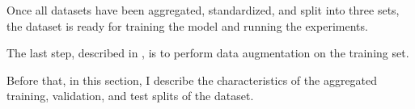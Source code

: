
Once all datasets have been aggregated, standardized, and
split into three sets, the dataset is ready for training the
model and running the experiments.

The last step, described in , is to
perform data augmentation on the training set.

Before that, in this section, I describe the characteristics
of the aggregated training, validation, and test splits of
the dataset.


